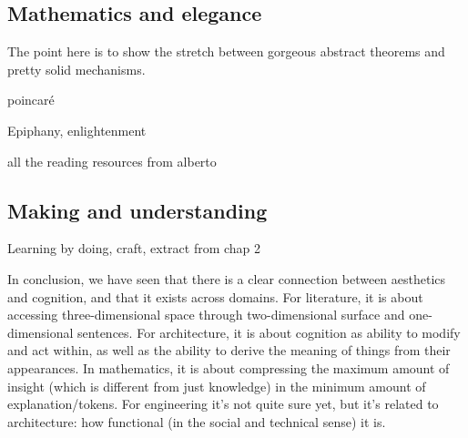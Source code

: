 
\subsection{Mathematics and elegance}
\label{subsec:aesthetic-mathematics}

The point here is to show the stretch between gorgeous abstract theorems and pretty solid mechanisms.

poincaré

Epiphany, enlightenment

all the reading resources from alberto


\subsection{Making and understanding}
\label{subsec:aesthetic-engineering}


Learning by doing, craft, extract from chap 2

\spacer

In conclusion, we have seen that there is a clear connection between aesthetics and cognition, and that it exists across domains. For literature, it is about accessing three-dimensional space through two-dimensional surface and one-dimensional sentences. For architecture, it is about cognition as ability to modify and act within, as well as the ability to derive the meaning of things from their appearances. In mathematics, it is about compressing the maximum amount of insight (which is different from just knowledge) in the minimum amount of explanation/tokens. For engineering it's not quite sure yet, but it's related to architecture: how functional (in the social and technical sense) it is.
